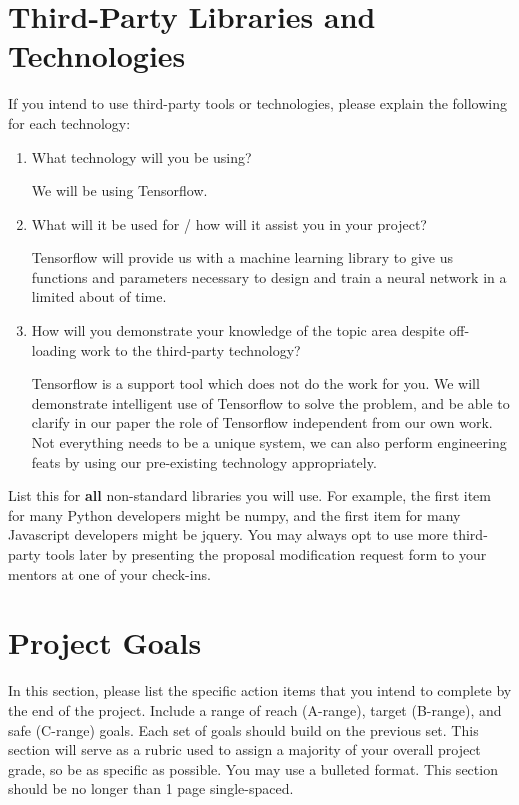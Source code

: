 \documentclass[]{article}
\begin{document}
\section{Third-Party Libraries and Technologies}

If you intend to use third-party tools or technologies, please explain the following for each technology:

\begin{enumerate}
	\item What technology will you be using?
        
        We will be using Tensorflow.
        
        \item What will it be used for / how will it assist you in your project?
        
        Tensorflow will provide us with a machine learning library to give us functions and parameters necessary to design and train a neural network in a limited about of time.
        
        \item How will you demonstrate your knowledge of the topic area despite off-loading work to the third-party technology?
        
        Tensorflow is a support tool which does not do the work for you.  We will demonstrate intelligent use of Tensorflow to solve the problem, and be able to clarify in our paper the role of Tensorflow independent from our own work.  Not everything needs to be a unique system, we can also perform engineering feats by using our pre-existing technology appropriately.
\end{enumerate}

List this for \textbf{all} non-standard libraries you will use. For example, the first item for many Python developers might be numpy, and the first item for many Javascript developers might be jquery. You may always opt to use more third-party tools later by presenting the proposal modification request form to your mentors at one of your check-ins.

\section{Project Goals}

In this section, please list the specific action items that you intend to complete by the end of the project. Include a range of reach (A-range), target (B-range), and safe (C-range) goals. Each set of goals should build on the previous set. This section will serve as a rubric used to assign a majority of your overall project grade, so be as specific as possible. You may use a bulleted format. This section should be no longer than 1 page single-spaced.
\end{document}
